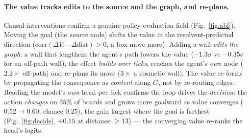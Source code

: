 \documentclass[11pt]{article}
\begin{document}
\paragraph{The value tracks edits to the source and the graph, and re-plans.} Causal interventions confirm a
genuine policy-evaluation field (Fig.~\ref{fig:abl}). Moving the goal (the \emph{source} node) shifts the
value in the resolvent-predicted direction ($\mathrm{corr}(\Delta V,-\Delta\text{dist}){>}0$, a box move
more). Adding a wall \emph{edits the graph}: a wall that
lengthens the agent's path lowers the value ($-1.3\sigma$ vs $-0.35\sigma$ for an off-path wall), the
effect \emph{builds over ticks}, reaches the agent's \emph{own} node ($2.2\times$ off-path) and re-plans its
move ($3\times$ a cosmetic wall). The value re-forms by propagating the consequence as \emph{content} along
$G$, not by re-routing edges. Reading the model's \emph{own}
head per tick confirms the loop drives the \emph{decision}: the action \emph{changes} on $35\%$ of boards and
grows more goalward as value converges ($0.52\!\to\!0.60$, chance $0.25$), the gain largest where the goal is
farthest (Fig.~\ref{fig:decide}, $+0.15$ at distance ${\ge}13$) --- the converging value re-ranks the head's logits.
\end{document}
